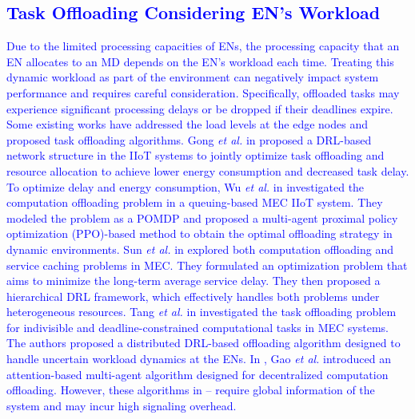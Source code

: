 \documentclass[10pt, journal,letterpaper]{IEEEtran}
\begin{document}
 \textcolor{blue}{\subsection{Task Offloading Considering EN's Workload}
Due to the limited processing capacities of ENs, the processing capacity that an EN allocates to an MD depends on the EN's workload each time. Treating this dynamic workload as part of the environment can negatively impact system performance and requires careful consideration. Specifically, offloaded tasks may experience significant processing delays or be dropped if their deadlines expire. Some existing works have addressed the load levels at the edge nodes and proposed task offloading algorithms.
Gong \textit{et al.} in \cite{gong2022edge} proposed a DRL-based network structure in the IIoT systems to jointly optimize task offloading and resource allocation to achieve lower energy consumption and decreased task delay.
To optimize delay and energy consumption, Wu \textit{et al.} in \cite{wu2023multi} investigated the computation offloading problem in a queuing-based MEC IIoT system. They modeled the problem as a POMDP and proposed a multi-agent proximal policy optimization (PPO)-based method to obtain the optimal offloading strategy in dynamic environments.
Sun \textit{et al.} in \cite{sun2024hierarchical} explored both computation offloading and service caching problems in MEC. They formulated an optimization problem that aims to minimize the long-term average service delay. They then proposed a hierarchical DRL framework, which effectively handles both problems under heterogeneous resources.
Tang \textit{et al.} in \cite{9253665} investigated the task offloading problem for indivisible and deadline-constrained computational tasks in MEC systems. The authors proposed a distributed DRL-based offloading algorithm designed to handle uncertain workload dynamics at the ENs. 
 In \cite{gao2022large}, Gao \textit{et al.} introduced an attention-based multi-agent algorithm designed for decentralized computation offloading.
However, these algorithms in \cite{gong2022edge}–\cite{gao2022large} require global information of the system and may incur high signaling overhead.}

\end{document}
